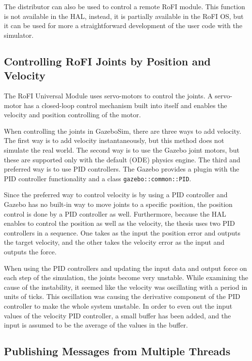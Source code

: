 \documentclass[
  printed, %
  color,   %
  notable, %
  oneside, %
  nolof,   %
  nolot,   %
  nocover,
]{fithesis3}
\newcommand{\code}[1]{\texttt{#1}}
\begin{document}
The distributor can also be used to control a remote RoFI module.
This function is not available in the HAL, instead, it is partially available in the RoFI OS, but it can be used for more a straightforward development of the user code with the simulator.

\subsection{Controlling RoFI Joints by Position and Velocity}

The RoFI Universal Module uses servo-motors to control the joints.
A servo-motor has a closed-loop control mechanism built into itself and enables the velocity and position controlling of the motor.

When controlling the joints in GazeboSim, there are three ways to add velocity.
The first way is to add velocity instantaneously, but this method does not simulate the real world.
The second way is to use the Gazebo joint motors, but these are supported only with the default (ODE) physics engine.
The third and preferred way is to use PID controllers.
The Gazebo provides a plugin with the PID controller functionality and a class \code{gazebo::common::PID}.

Since the preferred way to control velocity is by using a PID controller and Gazebo has no built-in way to move joints to a specific position, the position control is done by a PID controller as well.
Furthermore, because the HAL enables to control the position as well as the velocity, the thesis uses two PID controllers in a sequence.
One takes as the input the position error and outputs the target velocity, and the other takes the velocity error as the input and outputs the force.

When using the PID controllers and updating the input data and output force on each step of the simulation, the joints become very unstable.
While examining the cause of the instability, it seemed like the velocity was oscillating with a period in units of ticks.
This oscillation was causing the derivative component of the PID controller to make the whole system unstable.
In order to even out the input values of the velocity PID controller, a small buffer has been added, and the input is assumed to be the average of the values in the buffer.

\subsection{Publishing Messages from Multiple Threads}
\end{document}
